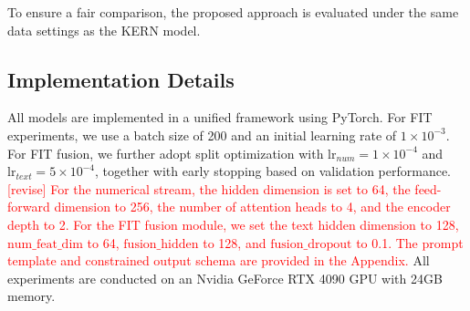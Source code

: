 \documentclass[Afour,sageh,times]{sagej}
\newcommand{\cui}[1]{\textcolor{blue}{[revise] #1}}
\newcommand{\zhang}[1]{\textcolor{red}{[revise] #1}}
\begin{document}
{\begin{itemize}
\end{itemize} 

To ensure a fair comparison, the proposed approach is evaluated under the same data settings as the KERN model.

\subsection{Implementation Details}

All models are implemented in a unified framework using PyTorch. For FIT experiments, we use a batch size of 200 and an initial learning rate of $1 \times 10^{-3}$. For FIT fusion, we further adopt split optimization with $\mathrm{lr}_{num}=1 \times 10^{-4}$ and $\mathrm{lr}_{text}=5 \times 10^{-4}$, together with early stopping based on validation performance. \zhang{For the numerical stream, the hidden dimension is set to 64, the feed-forward dimension to 256, the number of attention heads to 4, and the encoder depth to 2. For the FIT fusion module, we set the text hidden dimension to 128, $\mathrm{num\_feat\_dim}$ to 64, $\mathrm{fusion\_hidden}$ to 128, and $\mathrm{fusion\_dropout}$ to 0.1. The prompt template and constrained output schema are provided in the Appendix.} All experiments are conducted on an Nvidia GeForce RTX 4090 GPU with 24GB memory.




}
\end{document}
